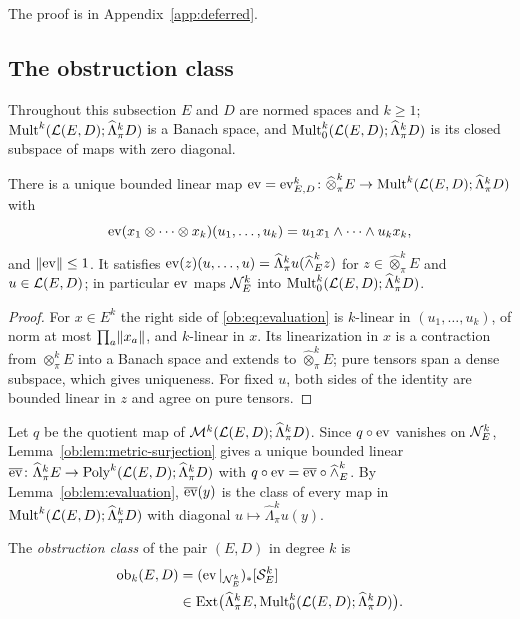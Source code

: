 The proof is in Appendix~\ref{app:deferred}.

\subsection{The obstruction class}\label{ob:ssec:class}

Throughout this subsection $E$ and $D$ are normed spaces and $k\ge1$; $\operatorname{Mult}^k(\mathcal L(E,D);\widehat\Lambda^k_\pi D)$ is a
Banach space, and $\operatorname{Mult}^k_0(\mathcal L(E,D);\widehat\Lambda^k_\pi D)$ is its closed subspace of maps with zero diagonal.

\begin{lemma}[evaluation]\label{ob:lem:evaluation}
There is a unique bounded linear map
$\operatorname{ev}=\operatorname{ev}^k_{E,D}\colon\widehat\otimes^k_\pi E\to\operatorname{Mult}^k(\mathcal L(E,D);\widehat\Lambda^k_\pi D)$ with
\begin{equation}\label{ob:eq:evaluation}
 \operatorname{ev}(x_1\otimes\dots\otimes x_k)(u_1,\dots,u_k)=u_1x_1\wedge\dots\wedge u_kx_k,
\end{equation}
and $\lVert \operatorname{ev}\rVert\le1$. It satisfies $\operatorname{ev}(z)(u,\dots,u)=\widehat\Lambda^k_\pi u(\widehat\wedge^k_Ez)$ for
$z\in\widehat\otimes^k_\pi E$ and $u\in\mathcal L(E,D)$; in particular $\operatorname{ev}$ maps $\mathcal N^k_E$ into
$\operatorname{Mult}^k_0(\mathcal L(E,D);\widehat\Lambda^k_\pi D)$.
\end{lemma}

\begin{proof}
For $x\in E^k$ the right side of \eqref{ob:eq:evaluation} is $k$-linear in $(u_1,\dots,u_k)$, of norm at most
$\prod_a\lVert x_a\rVert$, and $k$-linear in $x$. Its linearization in $x$ is a contraction from $\otimes^k_\pi E$ into a
Banach space and extends to $\widehat\otimes^k_\pi E$; pure tensors span a dense subspace, which gives uniqueness. For
fixed $u$, both sides of the identity are bounded linear in $z$ and agree on pure tensors.
\end{proof}

Let $q$ be the quotient map of $\mathcal M^k(\mathcal L(E,D);\widehat\Lambda^k_\pi D)$. Since $q\circ\operatorname{ev}$ vanishes on $\mathcal N^k_E$,
Lemma~\ref{ob:lem:metric-surjection} gives a unique bounded linear
$\overline{\operatorname{ev}}\colon\widehat\Lambda^k_\pi E\to\operatorname{Poly}^k(\mathcal L(E,D);\widehat\Lambda^k_\pi D)$ with
$q\circ\operatorname{ev}=\overline{\operatorname{ev}}\circ\widehat\wedge^k_E$. By Lemma~\ref{ob:lem:evaluation}, $\overline{\operatorname{ev}}(y)$ is the class of every
map in $\operatorname{Mult}^k(\mathcal L(E,D);\widehat\Lambda^k_\pi D)$ with diagonal $u\mapsto\widehat\Lambda^k_\pi u(y)$.

The \emph{obstruction class} of the pair $(E,D)$ in degree $k$ is
\begin{equation}\label{ob:eq:class}
 \begin{split}
 \operatorname{ob}_k(E,D)&=(\operatorname{ev}|_{\mathcal N^k_E})_*[\mathcal S^k_E]\\
 &\in\operatorname{Ext}\bigl(\widehat\Lambda^k_\pi E,\operatorname{Mult}^k_0(\mathcal L(E,D);\widehat\Lambda^k_\pi D)\bigr).
 \end{split}
\end{equation}

